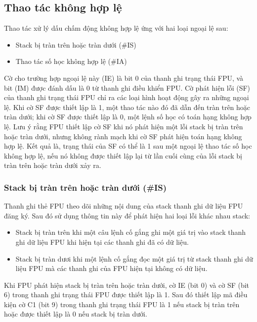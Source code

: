 		\subsection*{Thao tác không hợp lệ}
		Thao tác xử lý dấu chấm động không hợp lệ ứng với hai loại ngoại lệ sau:
		\begin{itemize}
				\renewcommand{\labelitemi}{\textbullet}
				\item Stack bị tràn trên hoặc tràn dưới (\#IS)
					\item Thao tác số học không hợp lệ (\#IA)
		\end{itemize}
		
		Cờ cho trường hợp ngoại lệ này (IE) là bit 0 của thanh ghi trạng thái FPU, và bit (IM) được đánh dấu là 0 từ thanh ghi điều khiển FPU. Cờ phát hiện lỗi (SF) của thanh ghi trạng thái FPU chỉ ra các loại hình hoạt động gây ra những ngoại lệ. Khi cờ SF được thiết lập là 1, một thao tác nào đó đã dẫn đến tràn trên hoặc tràn dưới; khi cờ SF được thiết lập là 0, một lệnh số học có toán hạng không hợp lệ. Lưu ý rằng FPU thiết lập cờ SF khi nó phát hiện một lỗi stack bị tràn trên hoặc tràn dưới, nhưng không rành mạch khi cờ SF phát hiện toán hạng không hợp lệ. Kết quả là, trạng thái của SF có thể là 1 sau một ngoại lệ thao tác số học không hợp lệ, nếu nó không được thiết lập lại từ lần cuối cùng của lỗi stack bị tràn trên hoặc tràn dưới xảy ra.
		
	\subsubsection*{	Stack bị tràn trên hoặc tràn dưới (\#IS)}
		Thanh ghi thẻ FPU theo dõi những nội dung của stack thanh ghi dữ liệu FPU đăng ký. Sau đó sử dụng thông tin này để phát hiện hai loại lỗi khác nhau stack:
		\begin{itemize}
			\renewcommand{\labelitemi}{\textbullet}
			\item Stack bị tràn trên khi một câu lệnh cố gắng ghi một giá trị vào stack thanh ghi dữ liệu FPU khi hiện tại các thanh ghi đã có dữ liệu.
			\item Stack bị tràn dươi khi một lệnh cố gắng đọc một giá trị từ stack thanh ghi dữ liệu FPU mà các thanh ghi của FPU hiện tại không có dữ liệu.
		\end{itemize} 	
	 
		Khi FPU phát hiện stack bị tràn trên hoặc tràn dưới, cờ IE (bit 0) và cờ SF (bit 6) trong thanh ghi trạng thái FPU được thiết lập là 1. Sau đó thiết lập mã điều kiện cờ C1 (bit 9) trong thanh ghi trạng thái  FPU là 1 nếu stack bị tràn trên hoặc được thiết lập là 0 nếu stack bị tràn dưới.\\
		
